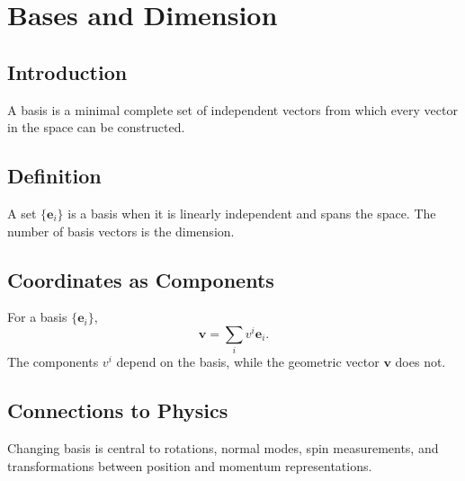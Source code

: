 \section{Bases and Dimension}
\label{sec:bases-dimension}
\subsection{Introduction}
A basis is a minimal complete set of independent vectors from which every vector in the space can be constructed.
\subsection{Definition}
A set $\{\mathbf e_i\}$ is a basis when it is linearly independent and spans the space. The number of basis vectors is the dimension.
\subsection{Coordinates as Components}
For a basis $\{\mathbf e_i\}$,
\[
\mathbf v=\sum_i v^i\mathbf e_i.
\]
The components $v^i$ depend on the basis, while the geometric vector $\mathbf v$ does not.
\subsection{Connections to Physics}
Changing basis is central to rotations, normal modes, spin measurements, and transformations between position and momentum representations.
